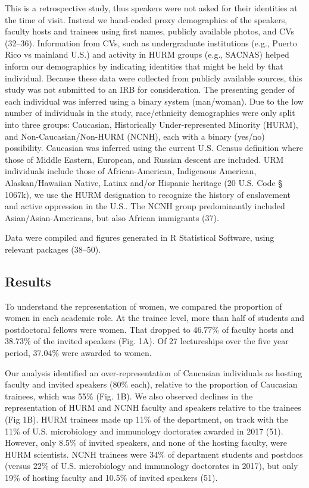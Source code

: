 \documentclass[10pt,]{article}
\begin{document}
This is a retrospective study, thus speakers were not asked for their
identities at the time of visit. Instead we hand-coded proxy
demographics of the speakers, faculty hosts and trainees using first
names, publicly available photos, and CVs (32--36). Information from
CVs, such as undergraduate institutions (e.g., Puerto Rico vs mainland
U.S.) and activity in HURM groups (e.g., SACNAS) helped inform our
demographics by indicating identities that might be held by that
individual. Because these data were collected from publicly available
sources, this study was not submitted to an IRB for consideration. The
presenting gender of each individual was inferred using a binary system
(man/woman). Due to the low number of individuals in the study,
race/ethnicity demographics were only split into three groups:
Caucasian, Historically Under-represented Minority (HURM), and
Non-Caucasian/Non-HURM (NCNH), each with a binary (yes/no) possibility.
Caucasian was inferred using the current U.S. Census definition where
those of Middle Eastern, European, and Russian descent are included. URM
individuals include those of African-American, Indigenous American,
Alaskan/Hawaiian Native, Latinx and/or Hispanic heritage (20 U.S. Code
§\,1067k), we use the HURM designation to recognize the history of
enslavement and active oppression in the U.S.. The NCNH group
predominantly included Asian/Asian-Americans, but also African
immigrants (37).

Data were compiled and figures generated in R Statistical Software,
using relevant packages (38--50).

\subsection{Results}\label{results}

To understand the representation of women, we compared the proportion of
women in each academic role. At the trainee level, more than half of
students and postdoctoral fellows were women. That dropped to 46.77\% of
faculty hosts and 38.73\% of the invited speakers (Fig. 1A). Of 27
lectureships over the five year period, 37.04\% were awarded to women.

Our analysis identified an over-representation of Caucasian individuals
as hosting faculty and invited speakers (80\% each), relative to the
proportion of Caucasian trainees, which was 55\% (Fig. 1B). We also
observed declines in the representation of HURM and NCNH faculty and
speakers relative to the trainees (Fig 1B). HURM trainees made up 11\%
of the department, on track with the 11\% of U.S. microbiology and
immunology doctorates awarded in 2017 (51). However, only 8.5\% of
invited speakers, and none of the hosting faculty, were HURM scientists.
NCNH trainees were 34\% of department students and postdocs (versus 22\%
of U.S. microbiology and immunology doctorates in 2017), but only 19\%
of hosting faculty and 10.5\% of invited speakers (51).
\end{document}
